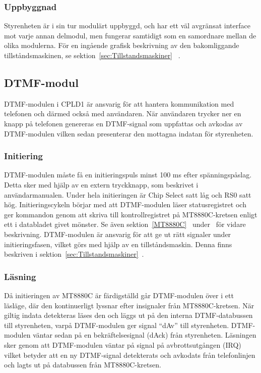 \documentclass[a4paper,11pt]{article}
\begin{document}
	\subsubsection{Uppbyggnad}

	Styrenheten är i sin tur modulärt uppbyggd, och har ett väl avgränsat interface mot varje annan delmodul, men fungerar samtidigt som en samordnare mellan de olika modulerna. För en ingående grafisk beskrivning av den bakomliggande tillståndsmaskinen, se sektion~\ref{sec:Tillstandsmaskiner} ~.

	\subsection{DTMF-modul}
		
	DTMF-modulen i CPLD1 är ansvarig för att hantera kommunikation med telefonen och därmed också med användaren.
	När användaren trycker ner en knapp på telefonen genereras en DTMF-signal som uppfattas och avkodas av DTMF-modulen vilken sedan presenterar den mottagna indatan för styrenheten.
		
	\subsubsection{Initiering}

	DTMF-modulen måste få en initieringspuls minst 100 ms efter spänningspåslag. Detta sker med hjälp av
	en extern tryckknapp, som beskrivet i användarmanualen. Under hela initieringen är Chip Select satt låg
	och RS0 satt hög. Initieringscykeln börjar med att DTMF-modulen läser statusregistret och ger kommandon genom att skriva till kontrollregistret på MT8880C-kretsen enligt ett i databladet givet mönster. Se även sektion~\ref{MT8880C}~ under~ för vidare beskrivning.
	DTMF-modulen är ansvarig för att ge ut rätt signaler under initieringsfasen, vilket görs med hjälp av en tillståndsmaskin. Denna finns beskriven i sektion~\ref{sec:Tillstandsmaskiner}~.
		
	\subsubsection{Läsning}

	Då initieringen av MT8880C är färdigställd går DTMF-modulen över i ett läsläge, där den kontinuerligt lyssnar efter insignaler från MT8880C-kretsen. När giltig indata detekteras läses den och läggs ut på den interna DTMF-databussen till styrenheten, varpå DTMF-modulen ger signal  ``dAv'' till styrenheten. DTMF-modulen väntar sedan på en bekräftelsesignal (dAck) från styrenheten. Läsningen sker genom att DTMF-modulen väntar på signal på avbrottsutgången (IRQ) vilket betyder att en ny DTMF-signal detekterats  och avkodats från telefonlinjen och lagts ut på databussen från MT8880C-kretsen.
\end{document}
